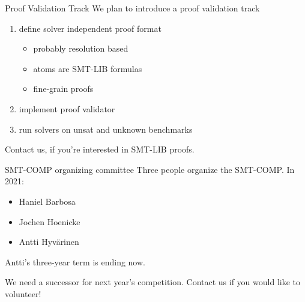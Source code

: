 \documentclass[table]{beamer}
\def\emph#1{\textcolor{MYblue}{#1}}
\begin{document}
\begin{frame}{Proof Validation Track}
  We plan to introduce a proof validation track
  \begin{enumerate}
  \item define \emph{solver independent} proof format
    \begin{itemize}
    \item probably resolution based %
    \item atoms are SMT-LIB formulas
    \item fine-grain proofs
    \end{itemize}
  \item implement proof validator
  \item run solvers on unsat \emph{and unknown} benchmarks
  \end{enumerate}
  \bigskip

  Contact us, if you're interested in SMT-LIB proofs.
\end{frame}

\begin{frame}{SMT-COMP organizing committee}
  Three people organize the SMT-COMP.  In 2021:
  \begin{itemize}
  \item Haniel Barbosa
  \item Jochen Hoenicke
  \item Antti Hyvärinen
  \end{itemize}
  
  Antti's three-year term is ending now.
  \bigskip
  
  We need a successor for next year's competition.
  Contact us if you would like to volunteer!
\end{frame}
\end{document}
